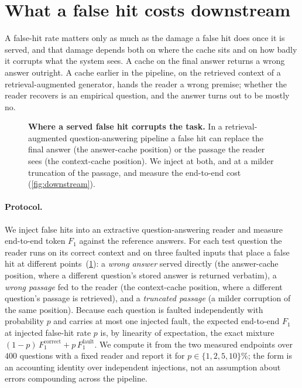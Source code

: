 \section{What a false hit costs downstream}
\label{sec:downstream}

A false-hit rate matters only as much as the damage a false hit does once it is served, and
that damage depends both on where the cache sits and on how badly it corrupts what the system
sees. A cache on the final answer returns a wrong answer outright. A cache earlier in the
pipeline, on the retrieved context of a retrieval-augmented generator, hands the reader a
wrong premise; whether the reader recovers is an empirical question, and the answer turns out
to be mostly no.

\begin{figure}[tbp]
  \centering
  
  \caption{\textbf{Where a served false hit corrupts the task.} In a retrieval-augmented
    question-answering pipeline a false hit can replace the final answer (the answer-cache
    position) or the passage the reader sees (the context-cache position). We inject at both,
    and at a milder truncation of the passage, and measure the end-to-end cost
    (\cref{fig:downstream}).}
  \label{fig:dsdiagram}
\end{figure}

\paragraph{Protocol.}
We inject false hits into an extractive question-answering reader and measure end-to-end
token $F_1$ against the reference answers. For each test question the reader runs on its
correct context and on three faulted inputs that place a false hit at different
points~(\cref{fig:dsdiagram}): a
\emph{wrong answer} served directly (the answer-cache position, where a different question's
stored answer is returned verbatim), a \emph{wrong passage} fed to the reader (the
context-cache position, where a different question's passage is retrieved), and a
\emph{truncated passage} (a milder corruption of the same position). Because each question is
faulted independently with probability $p$ and carries at most one injected fault, the expected
end-to-end $F_1$ at injected false-hit rate $p$ is, by linearity of expectation, the exact
mixture $(1-p)\,F_1^{\text{correct}} + p\,F_1^{\text{fault}}$. We compute it from the two
measured endpoints over $400$ questions with a fixed reader and report it for
$p \in \{1,2,5,10\}\%$; the form is an accounting identity over independent injections, not an
assumption about errors compounding across the pipeline.

